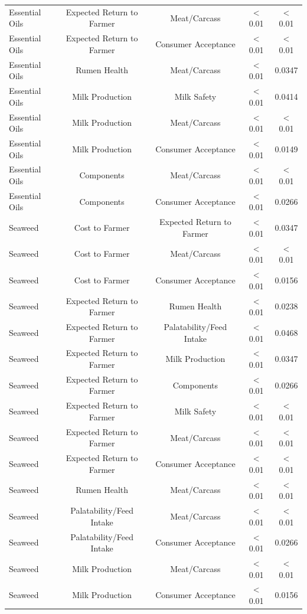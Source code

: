 \begin{table}
{\begin{threeparttable}
\begin{tabular}[t]{lcccc}
Essential Oils & Expected Return to Farmer & Meat/Carcass & < 0.01 & < 0.01\\
\addlinespace
Essential Oils & Expected Return to Farmer & Consumer Acceptance & < 0.01 & < 0.01\\
Essential Oils & Rumen Health & Meat/Carcass & < 0.01 & 0.0347\\
Essential Oils & Milk Production & Milk Safety & < 0.01 & 0.0414\\
Essential Oils & Milk Production & Meat/Carcass & < 0.01 & < 0.01\\
Essential Oils & Milk Production & Consumer Acceptance & < 0.01 & 0.0149\\
\addlinespace
Essential Oils & Components & Meat/Carcass & < 0.01 & < 0.01\\
Essential Oils & Components & Consumer Acceptance & < 0.01 & 0.0266\\
Seaweed & Cost to Farmer & Expected Return to Farmer & < 0.01 & 0.0347\\
Seaweed & Cost to Farmer & Meat/Carcass & < 0.01 & < 0.01\\
Seaweed & Cost to Farmer & Consumer Acceptance & < 0.01 & 0.0156\\
\addlinespace
Seaweed & Expected Return to Farmer & Rumen Health & < 0.01 & 0.0238\\
Seaweed & Expected Return to Farmer & Palatability/Feed Intake & < 0.01 & 0.0468\\
Seaweed & Expected Return to Farmer & Milk Production & < 0.01 & 0.0347\\
Seaweed & Expected Return to Farmer & Components & < 0.01 & 0.0266\\
Seaweed & Expected Return to Farmer & Milk Safety & < 0.01 & < 0.01\\
\addlinespace
Seaweed & Expected Return to Farmer & Meat/Carcass & < 0.01 & < 0.01\\
Seaweed & Expected Return to Farmer & Consumer Acceptance & < 0.01 & < 0.01\\
Seaweed & Rumen Health & Meat/Carcass & < 0.01 & < 0.01\\
Seaweed & Palatability/Feed Intake & Meat/Carcass & < 0.01 & < 0.01\\
Seaweed & Palatability/Feed Intake & Consumer Acceptance & < 0.01 & 0.0266\\
\addlinespace
Seaweed & Milk Production & Meat/Carcass & < 0.01 & < 0.01\\
Seaweed & Milk Production & Consumer Acceptance & < 0.01 & 0.0156\\

\end{tabular}
\end{threeparttable}}
\end{table}
